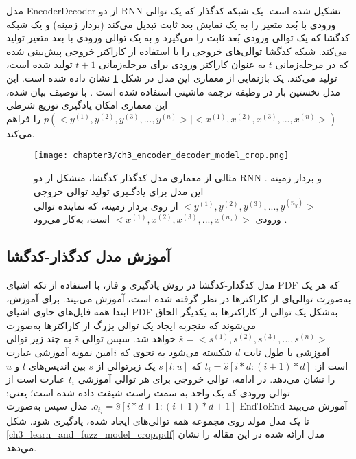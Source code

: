 مدل \gls{EncoderDecoder} \cite{DBLP:journals/corr/ChoMGBSB14,NIPS2014_5346} از دو \gls{RNN} تشکیل شده است. یک شبکه کدگذار که یک توالی ورودی با بُعد متغیر را به یک نمایش بعد ثابت تبدیل می‌کند (بردار زمینه) و یک شبکه کدگشا که یک توالی ورودی بُعد ثابت را می‌گیرد و به یک توالی ورودی با بعد متغیر تولید می‌کند. شبکه کدگشا توالی‌‌های خروجی را با استفاده از کاراکتر خروجی پیش‌بینی شده که در مرحله‌زمانی $ t $ به عنوان کاراکتر ورودی برای مرحله‌زمانی  $ t+1 $ تولید شده است، تولید می‌کند. یک بازنمایی از معماری این مدل در ‏شکل \ref{ch3_encoder_decoder_model_crop.png} نشان داده شده است. این مدل نخستین بار در وظیفه ترجمه ماشینی استفاده شده است \cite{DBLP:journals/corr/ChoMGBSB14}. با توصیف بیان شده، این معماری امکان یادگیری توزیع شرطی 
$ p(<y^{(1)}, y^{(2)}, y^{(3)}, ..., y^{(n)}>| <x^{(1)}, x^{(2)}, x^{(3)}, ..., x^{(n)}>) $ 
را فراهم می‌کند.

\begin{figure}%
	\centering
	\texttt{[image: chapter3/ch3\_encoder\_decoder\_model\_crop.png]}
	\caption[مدل \gls*{EncoderDecoder}]
	{
		مثالی از معماری مدل کدگذار-کدگشا، متشکل از دو \gls{RNN} و بردار زمینه . این مدل برای یادگـیری تولید توالی خروجی 
		$ <y^{(1)}, y^{(2)}, y^{(3)}, ..., y^{(n_y)}> $ 
		 از روی بردار زمینه، که نماینده توالی ورودی 
		$ <x^{(1)}, x^{(2)}, x^{(3)}, ..., x^{(n_x)}> $ 
		  است، به‌کار می‌رود \cite{Goodfellow-et-al-2016}.
	}
	\label{ch3_encoder_decoder_model_crop.png}
\end{figure}

\subsection{آموزش مدل کدگذار-کدگشا}
مدل کدگذار-کدگشا در روش یادگیری و فاز، با استفاده از تکه‌ اشیای \gls{PDF} که هر یک به‌صورت توالی‌ای از کاراکترها در نظر گرفته شده است، آموزش می‌بیند. برای آموزش، ابتدا همه فایل‌های حاوی اشیای \gls{PDF} به‌شکل یک توالی از کاراکترها به یکدیگر الحاق  می‌شوند که منجربه ایجاد یک توالی بزرگ از کاراکترها به‌صورت 
$ \hat{s} = <s^{(1)}, s^{(2)}, s^{(3)}, ..., s^{(n)}> $
 خواهد شد. سپس توالی $ \hat{s} $ به چند زیر توالی آموزشی با طول ثابت $ d $ شکسته می‌شود به نحوی که $ i $امین نمونه آموزشی عبارت است از: 
 $ t_i = \hat{s}[i*d: (i+1)*d] $
  که 
  $ s[l:u] $
  یک زیرتوالی از $ s $ بین اندیس‌های $ l $ و $ u $ را نشان می‌دهد. در ادامه، توالی خروجی برای هر توالی آموزشی $ t_i $ عبارت است از توالی ورودی که یک واحد به سمت راست شیفت داده شده است؛ یعنی:
  $ o_{t_i} = \hat{s}[i*d+1: (i+1)*d+1] $.
  مدل سپس به‌صورت \gls{EndToEnd} آموزش می‌بیند تا یک مدل مولد روی مجموعه همه توالی‌های ایجاد شده، یادگیری شود. شکل \ref{ch3_learn_and_fuzz_model_crop.pdf} مدل ارائه شده در این مقاله را نشان می‌دهد.

